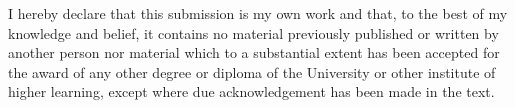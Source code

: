 
I hereby declare that this submission is my own work and that, to the best of my knowledge and
belief, it contains no material previously published or written by another person nor material which
to a substantial extent has been accepted for the award of any other degree or diploma of the
University or other institute of higher learning, except where due acknowledgement has been made in
the text.

\vspace{3cm}
\textbf{\tname}

\vspace{1cm}
\ifdefined\tdateRevised
    \tdateRevised
\else
    \tdateSubmitted
\fi


